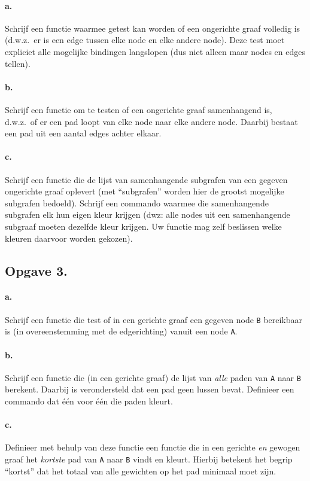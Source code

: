 \documentclass[11pt]{article}
\begin{document}
\paragraph{a.}
Schrijf een functie waarmee getest kan worden of een ongerichte graaf
volledig is (d.w.z.\ er is een edge tussen elke node en elke andere node).
Deze test moet expliciet alle mogelijke bindingen langslopen (dus niet
alleen maar nodes en edges tellen).

\paragraph{b.}
Schrijf een functie om te testen of een ongerichte graaf samenhangend is,
d.w.z.\ of er een pad loopt van elke node naar elke andere node.
Daarbij bestaat een pad uit een aantal edges achter elkaar.

\paragraph{c.}
Schrijf een functie die de lijst van samenhangende subgrafen van een gegeven
ongerichte graaf oplevert (met ``subgrafen'' worden hier de grootst
mogelijke subgrafen bedoeld).
Schrijf een commando waarmee die samenhangende subgrafen elk hun eigen
kleur krijgen
(dwz: alle nodes uit een samenhangende subgraaf moeten de\-zelf\-de kleur
krijgen.
Uw functie mag zelf beslissen welke kleuren daarvoor worden gekozen).

\subsection*{Opgave 3.}
\paragraph{a.}
Schrijf een functie die test of in een gerichte graaf een gegeven
node \verb!B! bereikbaar is (in overeenstemming met de edgerichting) vanuit een node \verb!A!.

\paragraph{b.}
Schrijf een functie die (in een gerichte graaf) de lijst van {\em alle\/}
paden van \verb!A! naar \verb!B! berekent.
Daarbij is verondersteld dat een pad geen lussen bevat.
Definieer een commando dat \'e\'en voor \'e\'en die paden kleurt.

\paragraph{c.}
Definieer met behulp van deze functie een functie die in een gerichte
{\em en\/} gewogen graaf het {\em kortste\/} pad van \verb!A! naar
\verb!B! vindt en kleurt.
Hierbij betekent het begrip ``kortst'' dat het totaal van alle gewichten op
het pad minimaal moet zijn.
\end{document}
